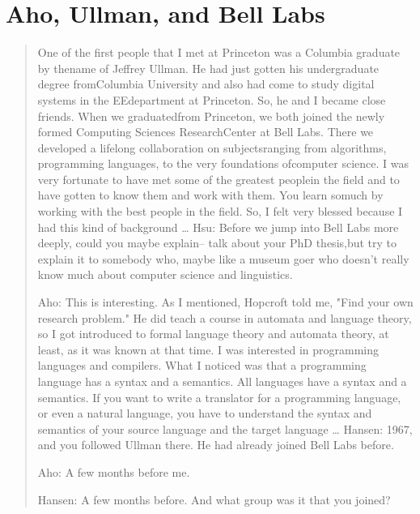 \section{Aho, Ullman, and Bell Labs}
\begin{quotation}
    One of the first people that I met at Princeton was a Columbia graduate by thename of Jeffrey 
Ullman. He had just gotten his undergraduate degree fromColumbia University and also had come to 
study digital systems in the EEdepartment at Princeton. So, he and I became close friends. When we 
graduatedfrom Princeton, we both joined the newly formed Computing Sciences ResearchCenter at Bell 
Labs. There we developed a lifelong collaboration on subjectsranging from algorithms, programming 
languages, to the very foundations ofcomputer science. I was very fortunate to have met some of the 
greatest peoplein the field and to have gotten to know them and work with them. You learn somuch by 
working with the best people in the field. So, I felt very blessed because I had this kind of 
background
\dots
Hsu: Before we jump into Bell Labs more deeply, could you maybe explain-- talk about your PhD 
thesis,but try to explain it to somebody who, maybe like a museum goer who doesn't really know much 
about computer science and linguistics.

Aho: This is interesting. As I mentioned, Hopcroft told me, "Find your own research problem." He 
did teach a course in automata and language theory, so I got introduced to formal language theory 
and automata theory, at least, as it was known at that time. I was interested in programming 
languages and compilers. What I noticed was that a programming language has a syntax and a 
semantics. All languages have a syntax and a semantics. If you want to write a translator for a 
programming language, or even a natural language, you have to understand the syntax and semantics of 
your source language and the target language
\dots
Hansen: 1967, and you followed Ullman there. He had already joined Bell Labs before.

Aho: A few months before me.

Hansen: A few months before. And what group was it that you joined?


\end{quotation}
